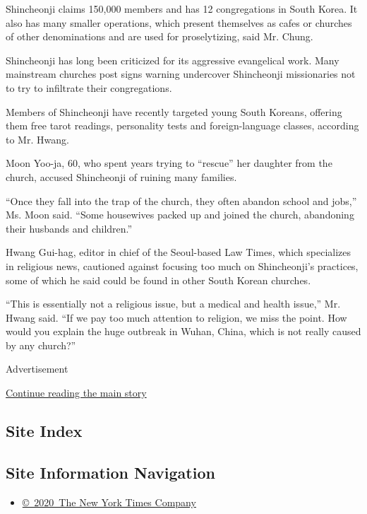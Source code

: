 Shincheonji claims 150,000 members and has 12 congregations in South
Korea. It also has many smaller operations, which present themselves as
cafes or churches of other denominations and are used for proselytizing,
said Mr. Chung.

Shincheonji has long been criticized for its aggressive evangelical
work. Many mainstream churches post signs warning undercover Shincheonji
missionaries not to try to infiltrate their congregations.

Members of Shincheonji have recently targeted young South Koreans,
offering them free tarot readings, personality tests and
foreign-language classes, according to Mr. Hwang.

Moon Yoo-ja, 60, who spent years trying to ``rescue'' her daughter from
the church, accused Shincheonji of ruining many families.

``Once they fall into the trap of the church, they often abandon school
and jobs,'' Ms. Moon said. ``Some housewives packed up and joined the
church, abandoning their husbands and children.''

Hwang Gui-hag, editor in chief of the Seoul-based Law Times, which
specializes in religious news, cautioned against focusing too much on
Shincheonji's practices, some of which he said could be found in other
South Korean churches.

``This is essentially not a religious issue, but a medical and health
issue,'' Mr. Hwang said. ``If we pay too much attention to religion, we
miss the point. How would you explain the huge outbreak in Wuhan, China,
which is not really caused by any church?''

Advertisement

\protect\hyperlink{after-bottom}{Continue reading the main story}

\hypertarget{site-index}{%
\subsection{Site Index}\label{site-index}}

\hypertarget{site-information-navigation}{%
\subsection{Site Information
Navigation}\label{site-information-navigation}}

\begin{itemize}
\tightlist
\item
  \href{https://help.nytimes.com/hc/en-us/articles/115014792127-Copyright-notice}{©~2020~The
  New York Times Company}
\end{itemize}

